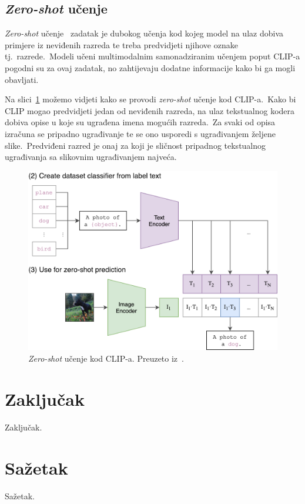 \documentclass[times, utf8, seminar, numeric]{fer}
\begin{document}
\section{\textit{Zero-shot} učenje}

\textit{Zero-shot} učenje~\cite{xian2018zero} zadatak je dubokog učenja kod kojeg model na ulaz dobiva primjere iz neviđenih razreda te treba predvidjeti njihove oznake tj.\ razrede.\ 
Modeli učeni multimodalnim samonadziranim učenjem poput CLIP-a pogodni su za ovaj zadatak, no zahtijevaju dodatne informacije kako bi ga mogli obavljati.\

Na slici~\ref{fig:CLIP_zero_shot} možemo vidjeti kako se provodi \textit{zero-shot} učenje kod CLIP-a.\ 
Kako bi CLIP mogao predvidjeti jedan od neviđenih razreda, na ulaz tekstualnog kodera dobiva opise u koje su ugrađena imena mogućih razreda.\ 
Za svaki od opisa izračuna se pripadno ugrađivanje te se ono usporedi s ugrađivanjem željene slike.\ Predviđeni razred je onaj za koji je sličnost pripadnog tekstualnog ugrađivanja sa slikovnim ugrađivanjem najveća.\

\begin{figure}[h]
    \centering
    \includegraphics[scale=0.5]{./Slike/CLIP_zero_shot.png}
    \caption{\textit{Zero-shot} učenje kod CLIP-a. Preuzeto iz~\cite{radford2021learning}.}
    \label{fig:CLIP_zero_shot}
\end{figure}

\chapter{Zaključak}
Zaključak.




\chapter{Sažetak}
Sažetak.
\end{document}
